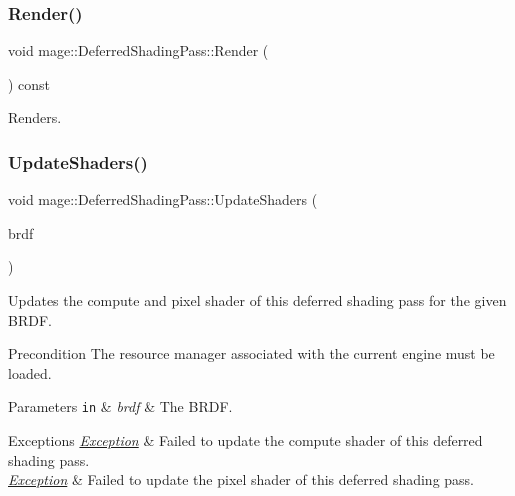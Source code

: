 \subsubsection{\texorpdfstring{Render()}{Render()}}
{\footnotesize\ttfamily void mage\+::\+Deferred\+Shading\+Pass\+::\+Render (\begin{DoxyParamCaption}{ }\end{DoxyParamCaption}) const\hspace{0.3cm}{\ttfamily [noexcept]}}

Renders. \hypertarget{classmage_1_1_deferred_shading_pass_a1be48c61dfb255a1641bae23d5277e4f}{}\label{classmage_1_1_deferred_shading_pass_a1be48c61dfb255a1641bae23d5277e4f} 
\subsubsection{\texorpdfstring{Update\+Shaders()}{UpdateShaders()}}
{\footnotesize\ttfamily void mage\+::\+Deferred\+Shading\+Pass\+::\+Update\+Shaders (\begin{DoxyParamCaption}\item[{\hyperlink{namespacemage_ae7a7a03a7b34d7e2689689bb8295cd38}{B\+R\+D\+F\+Type}}]{brdf }\end{DoxyParamCaption})\hspace{0.3cm}{\ttfamily [private]}}

Updates the compute and pixel shader of this deferred shading pass for the given B\+R\+DF.

\begin{DoxyPrecond}{Precondition}
The resource manager associated with the current engine must be loaded. 
\end{DoxyPrecond}

\begin{DoxyParams}[1]{Parameters}
\mbox{\tt in}  & {\em brdf} & The B\+R\+DF. \\
\hline
\end{DoxyParams}

\begin{DoxyExceptions}{Exceptions}
{\em \hyperlink{classmage_1_1_exception}{Exception}} & Failed to update the compute shader of this deferred shading pass. \\
\hline
{\em \hyperlink{classmage_1_1_exception}{Exception}} & Failed to update the pixel shader of this deferred shading pass. \\
\hline
\end{DoxyExceptions}


